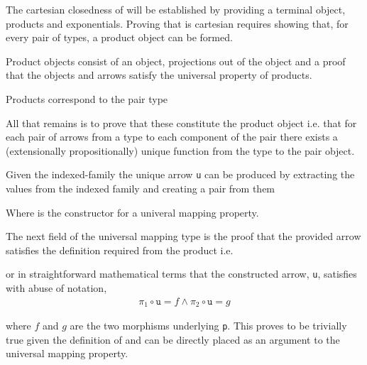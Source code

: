 
The cartesian closedness of  will be established by
providing a terminal object, products and exponentials.  Proving that
 is cartesian requires showing that, for every pair of
types, a product object can be formed.


Product objects consist of an object, projections out of the object and a proof
that the objects and arrows satisfy the universal property of products.

Products correspond to the pair type




All that remains is to prove that these constitute the product object i.e. that
for each pair of arrows from a type to each component of the pair there exists a
(extensionally propositionally) unique function from the type to the pair object.


Given the indexed-family the unique arrow \verb|u| can be produced by extracting
the values from the indexed family and creating a pair from them



Where  is the constructor for
a univeral mapping property.

The next field of the universal mapping type is the proof that the provided
arrow satisfies the definition required from the product i.e.


or in straightforward mathematical terms that the constructed arrow, \verb|u|,
satisfies with abuse of notation,
\begin{align*}
    \pi_{1} \circ \texttt{u} = f \land \pi_{2} \circ \texttt{u} = g
\end{align*}

where $f$ and $g$ are the two morphisms underlying \verb|p|. This proves to be
trivially true given the definition of  and can be
directly placed as an argument to the universal mapping property.

